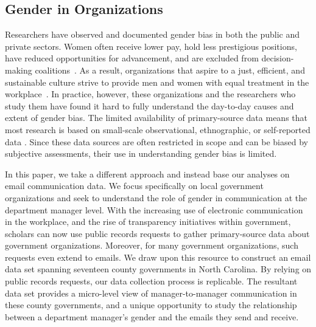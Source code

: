 \documentclass{pnastwo}
\begin{document}
\begin{article}

\section{Gender in Organizations}

Researchers have observed and documented gender bias in both the
public and private sectors. Women often receive lower pay, hold less
prestigious positions, have reduced opportunities for advancement, and
are excluded from decision-making coalitions~\citep{Brass1985,
  Bielby1986a, Ibarra1992, Albrecht2003, Duncan2004}. As a result,
organizations that aspire to a just, efficient, and sustainable
culture strive to provide men and women with equal treatment in the
workplace~\citep{Ely2000}. In practice, however, these organizations
and the researchers who study them have found it hard to fully
understand the day-to-day causes and extent of gender bias. The
limited availability of primary-source data means that most research
is based on small-scale observational, ethnographic, or self-reported
data \citep[e.g.,][]{Castilla2005, Adams2007, Elsesser2011}. Since
these data sources are often restricted in scope and can be biased by
subjective assessments, their use in understanding gender bias is
limited.

In this paper, we take a different approach and instead base our
analyses on email communication data. We focus specifically on local
government organizations and seek to understand the role of gender in
communication at the department manager level. With the increasing use
of electronic communication in the workplace, and the rise of
transparency initiatives within government, scholars can now use
public records requests to gather primary-source data about government
organizations. Moreover, for many government organizations, such
requests even extend to emails. We draw upon this resource to
construct an email data set spanning seventeen county governments in
North Carolina. By relying on public records requests, our data
collection process is replicable. The resultant data set provides a
micro-level view of manager-to-manager communication in these county
governments, and a unique opportunity to study the relationship
between a department manager's gender and the emails they send and
receive.


\end{article}
\end{document}
